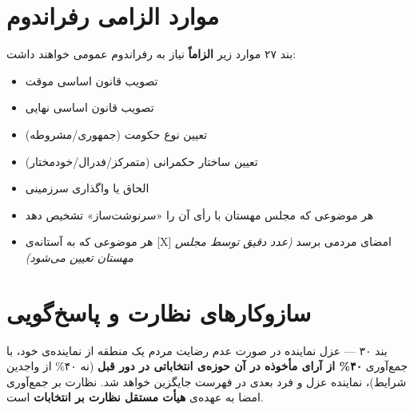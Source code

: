 \begin{center}
{
	}%
\end{center}
\vspace{0.5\baselineskip}

\section{موارد الزامی رفراندوم}

\begin{bandbox}{بند ۲۷}
	موارد زیر \textbf{الزاماً} نیاز به رفراندوم عمومی خواهند داشت:
	\begin{itemize}
		\item تصویب قانون اساسی موقت
		\item تصویب قانون اساسی نهایی
		\item تعیین نوع حکومت (جمهوری/مشروطه)
		\item تعیین ساختار حکمرانی (متمرکز/فدرال/خودمختار)
		\item الحاق یا واگذاری سرزمینی
		\item هر موضوعی که مجلس مهستان با رأی  آن را «سرنوشت‌ساز» تشخیص دهد
		\item هر موضوعی که به آستانه‌ی [X] امضای مردمی برسد
		\textit{(عدد دقیق توسط مجلس مهستان تعیین می‌شود)}
	\end{itemize}
\end{bandbox}

\section{سازوکارهای نظارت و پاسخ‌گویی}

\begin{bandbox}{بند ۳۰ --- عزل نماینده}
	در صورت عدم رضایت مردم یک منطقه از نماینده‌ی خود، با جمع‌آوری \textbf{۴۰\% از
		آرای مأخوذه در آن حوزه‌ی انتخاباتی در دور قبل} (نه ۴۰\% از واجدین شرایط)،
	نماینده عزل و فرد بعدی در فهرست جایگزین خواهد شد. نظارت بر جمع‌آوری امضا به
	عهده‌ی \textbf{هیأت مستقل نظارت بر انتخابات} است.
\end{bandbox}

